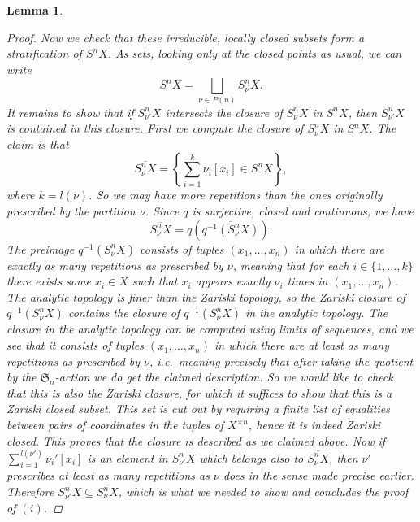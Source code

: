 \documentclass[12pt,a4paper]{amsart}
\theoremstyle{plain}
\newtheorem{lm}[thm]{Lemma}
\theoremstyle{definition}
\theoremstyle{remark}
\begin{document}
\begin{lm}
\begin{proof}
    Now we check that these irreducible, locally closed subsets form a stratification of $S^{n}X$.
    As sets, looking only at the closed points as usual, we can write
    \[ S^{n}X = \bigsqcup_{\nu \in P(n)} S^{n}_{\nu}X. \]
    It remains to show that if $S^{n}_{\nu'}X$ intersects the closure of $S^{n}_{\nu}X$ in $S^{n}X$, then $S^{n}_{\nu'}X$ is contained in this closure.
    First we compute the closure of $S^{n}_{\nu}X$ in $S^{n}X$.
    The claim is that
    \[ \overline{S^{n}_{\nu}X} = \left\{ \sum_{i=1}^{k} \nu_{i} [x_{i}] \in S^{n}X \right\}, \]
    where $k = l(\nu)$.
    So we may have more repetitions than the ones originally prescribed by the partition $\nu$.
    Since $q$ is surjective, closed and continuous, we have
    \[ \overline{S^{n}_{\nu}X} = q(\overline{q^{-1}(S^{n}_{\nu}X)}). \]
    The preimage $q^{-1}(S^{n}_{\nu}X)$ consists of tuples $(x_{1}, \ldots, x_{n})$ in which there are exactly as many repetitions as prescribed by $\nu$, meaning that for each $i \in \{1, \ldots, k\}$ there exists some $x_{i} \in X$ such that $x_{i}$ appears exactly $\nu_{i}$ times in $(x_{1}, \ldots, x_{n})$.
    The analytic topology is finer than the Zariski topology, so the Zariski closure of $q^{-1}(S^{n}_{\nu}X)$ contains the closure of $q^{-1}(S^{n}_{\nu}X)$ in the analytic topology.
    The closure in the analytic topology can be computed using limits of sequences, and we see that it consists of tuples $(x_{1}, \ldots, x_{n})$ in which there are at least as many repetitions as prescribed by $\nu$, i.e.~meaning precisely that after taking the quotient by the $\mathfrak{S}_{n}$-action we do get the claimed description.
    So we would like to check that this is also the Zariski closure, for which it suffices to show that this is a Zariski closed subset.
    This set is cut out by requiring a finite list of equalities between pairs of coordinates in the tuples of $X^{\times n}$, hence it is indeed Zariski closed.
    This proves that the closure is described as we claimed above.
    Now if $\sum_{i=1}^{l(\nu')}\nu_{i}'[x_{i}]$ is an element in $S^{n}_{\nu'}X$ which belongs also to $\overline{S^{n}_{\nu}X}$, then $\nu'$ prescribes at least as many repetitions as $\nu$ does in the sense made precise earlier.
    Therefore $S^{n}_{\nu'}X \subseteq \overline{S^{n}_{\nu}X}$, which is what we needed to show and concludes the proof of $(i)$.
  \end{proof}
\end{lm}
\end{document}
